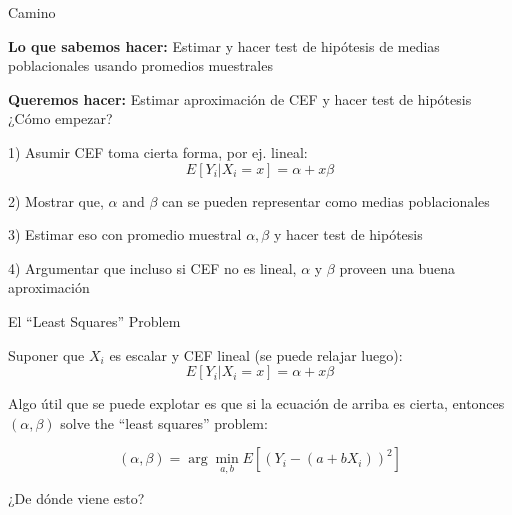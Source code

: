 \documentclass[11pt,handout,aspectratio=169]{beamer}
\newenvironment{wideitemize}{\itemize\addtolength{\itemsep}{10pt}}{\enditemize}
\begin{document}
\begin{frame}{Camino}
\vspace{0.2cm}
\begin{wideitemize}
\item \textbf{Lo que sabemos hacer:} Estimar y hacer test de hipótesis de medias poblacionales usando promedios muestrales
\item \textbf{Queremos hacer:} Estimar aproximación de CEF y hacer test de hipótesis
\end{wideitemize}
\pause
\bigskip
¿Cómo empezar? 
\pause
\begin{wideitemize}
	\item 1) Asumir CEF toma cierta forma, por ej. lineal:
	$$E[Y_i | X_i = x] = \alpha + x \beta$$
	
	\pause
	\item 2) Mostrar que, $\alpha$ and $\beta$ can  se pueden representar como medias poblacionales
	
	\pause
	\item
	3) Estimar eso con promedio muestral $\alpha,\beta$ y hacer test de hipótesis
	
	\pause
	\item
	4) Argumentar que incluso si CEF no es lineal, $\alpha$ y $\beta$ proveen una buena aproximación
\end{wideitemize}

\end{frame}


\begin{frame}{El ``Least Squares'' Problem}

\begin{wideitemize}

\item
Suponer que $X_i$ es escalar y CEF lineal (se puede relajar luego):
$$E[Y_i | X_i = x] = \alpha + x \beta$$

\pause
\item
Algo útil que se puede explotar es que si la ecuación de arriba es cierta, entonces $(\alpha,\beta)$ solve the ``least squares'' problem:

$$(\alpha,\beta)=\arg\min_{a,b} E[ (Y_i - (a + b X_i))^2  ] $$


\pause
\item
¿De dónde viene esto?

\end{wideitemize}
	
\end{frame}
\end{document}
